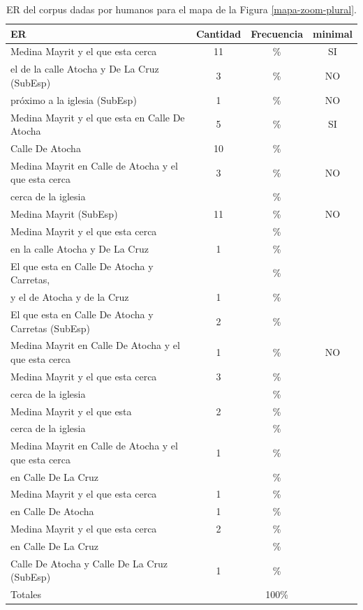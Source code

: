 \begin{table}[h!]
\begin{small}
\begin{center}
\begin{tabular}{|l|c|c|c|}
\hline
ER 					      & Cantidad &  Frecuencia & minimal\\ \hline
Medina Mayrit y el que esta cerca        &	11	&	\% &SI \\
el de la calle Atocha y De La Cruz (SubEsp)      &	3  &	\%	&NO\\
pr\'oximo a la iglesia (SubEsp)	      &1		&	\%	&NO\\
Medina Mayrit y el que esta en Calle De Atocha	      &5		&	\%	&SI\\
Calle De Atocha				&	10  &	\%	&\\
Medina Mayrit en Calle de Atocha y el que esta cerca				& 3  &	\%	&NO\\
cerca de la iglesia				&	  &	\%	&\\
Medina Mayrit	(SubEsp)		&11		&	\%	&NO\\
Medina Mayrit y el que esta cerca				&		&	\%  &\\
en la calle Atocha y De La Cruz        &	1  &	\%	&\\
El que esta en Calle De Atocha y Carretas, 	      &		&	\%	&\\
y el de Atocha y de la Cruz	      &1		&	\%	&\\
El que esta en Calle De Atocha y Carretas (SubEsp)					&	2  &	\%	&\\
Medina Mayrit en Calle De Atocha y el que esta cerca  				&  1 &	\%	&NO\\
Medina Mayrit y el que esta cerca				&		3 &	\%  &\\
cerca de la iglesia				&	  &	\%	&\\
Medina Mayrit y el que esta 	&	2	&	\%  &\\
cerca de la iglesia				&	  &	\%	&\\
Medina Mayrit en Calle de Atocha y el que esta cerca			&1  &	\%	&\\
en Calle De La Cruz	&	  &	\%	&\\
Medina Mayrit y el que esta cerca			&1  &	\%	&\\
en Calle De Atocha	&	1  &	\%	&\\
Medina Mayrit y el que esta cerca			&2  &	\%	&\\
en Calle De La Cruz	&	  &	\%	&\\
Calle De Atocha y Calle De La Cruz  (SubEsp)					&1  &	\%	&\\
\hline
Totales	&	&	100\%	\\

\hline
\end{tabular}
\caption{ER del corpus dadas por humanos para el mapa de la Figura \ref{mapa-zoom-plural}.}\label{freq-mapa-zoom-plural}
\end{center}
\end{small}
\end{table}




